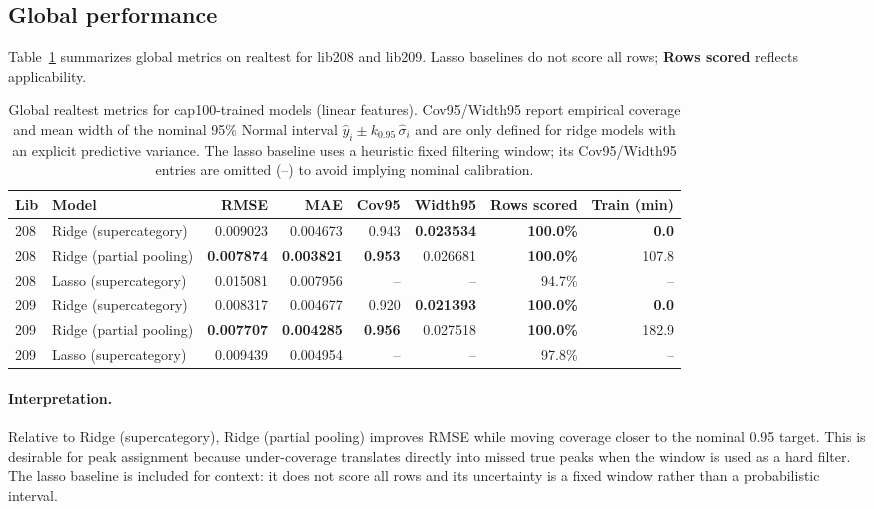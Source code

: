 \documentclass[11pt]{article}
\begin{document}
\subsection{Global performance}

Table~\ref{tab:global_metrics} summarizes global metrics on realtest for lib208 and lib209. Lasso baselines do not
score all rows; \textbf{Rows scored} reflects applicability.

\begin{table}[H]
\centering
\caption{Global realtest metrics for cap100-trained models (linear features). Cov95/Width95 report empirical coverage and
mean width of the nominal 95\% Normal interval $\hat{y}_i \pm k_{0.95}\,\hat{\sigma}_i$ and are only defined for ridge
models with an explicit predictive variance. The lasso baseline uses a heuristic fixed filtering window; its Cov95/Width95
entries are omitted (--) to avoid implying nominal calibration.}
\label{tab:global_metrics}
\begin{tabular}{llrrrrrr}
\toprule
Lib & Model & RMSE & MAE & Cov95 & Width95 & Rows scored & Train (min) \\
\midrule
208 & Ridge (supercategory) & 0.009023 & 0.004673 & 0.943 & \textbf{0.023534} & \textbf{100.0\%} & \textbf{0.0} \\
208 & Ridge (partial pooling) & \textbf{0.007874} & \textbf{0.003821} & \textbf{0.953} & 0.026681 & \textbf{100.0\%} & 107.8 \\
208 & Lasso (supercategory) & 0.015081 & 0.007956 & -- & -- & 94.7\% & -- \\
\midrule
209 & Ridge (supercategory) & 0.008317 & 0.004677 & 0.920 & \textbf{0.021393} & \textbf{100.0\%} & \textbf{0.0} \\
209 & Ridge (partial pooling) & \textbf{0.007707} & \textbf{0.004285} & \textbf{0.956} & 0.027518 & \textbf{100.0\%} & 182.9 \\
209 & Lasso (supercategory) & 0.009439 & 0.004954 & -- & -- & 97.8\% & -- \\
\bottomrule
\end{tabular}
\end{table}

\paragraph{Interpretation.}
Relative to Ridge (supercategory), Ridge (partial pooling) improves RMSE while moving coverage
closer to the nominal 0.95 target. This is desirable for peak assignment because under-coverage translates directly into
missed true peaks when the window is used as a hard filter.
The lasso baseline is included for context: it does not score all rows and its uncertainty is a fixed window rather than
a probabilistic interval.
\end{document}
